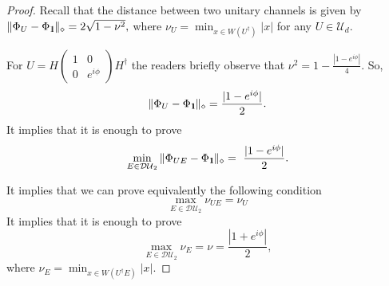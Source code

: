 \documentclass[preprint,12pt, a4paper]{elsarticle}
\newcommand{\1}{{\rm 1\hspace{-0.9mm}l}}
\newcommand{\Id}{{\rm 1\hspace{-0.9mm}l}}
\newcommand{\diaguni}{\ensuremath{\mathcal{DU}}}
\begin{document}
\begin{proof} Recall that the distance between two unitary channels is given by
	$
	\| \Phi_U  - \Phi_{\1} \|_\diamond = 2 \sqrt{1-\nu^2},
	$
	where $\nu_U = \min_{x \in W(U^\dagger)} |x|  $ for any $U \in \mathcal{U}_d$. 


	
	
	For $U = H 
	\left(\begin{array}{cc}1&0\\0&e^{i \phi}\end{array}\right)  H^\dagger$ the readers briefly observe that  $\nu^2 = 1 - \frac{|1 - e^{i \phi} | }{4}$. So, 
	\begin{equation}
	\|  \Phi_U  - \Phi_{\1} \|_\diamond = \frac{| 1 - e^{i \phi} |}{2}. 
	\end{equation} 
		It implies that it is enough to prove  \begin{equation}
		\min_{E \in \diaguni_2} \|\Phi_{UE} - 
		\Phi_\Id\|_\diamond  = \frac{| 1 - e^{i \phi} |}{2}.
		\end{equation}
	
	
	
		It implies that we can prove  equivalently  the following condition
		\begin{equation}
		\max_{E \in \diaguni_2 } \nu_{UE} = \nu_U
		\end{equation}
	It implies that it is enough to prove 
	\begin{equation}
	\max_{E \in \diaguni_2 } \nu_E = \nu = \frac{|1 + e^{i \phi} | }{2},
	\end{equation}
	where $\nu_E = \min_{x \in W(U^\dagger E)} |x|. $ 
	

\end{proof}
\end{document}
